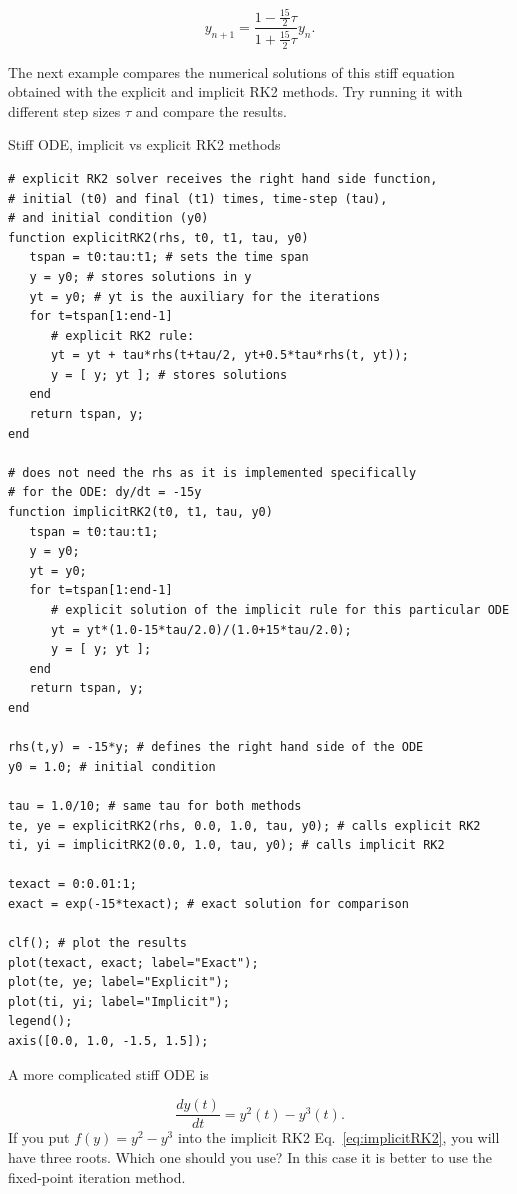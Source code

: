 \begin{equation}
 y_{n+1} = \dfrac{1 - \frac{15}{2}\tau}{1+\frac{15}{2}\tau} y_n.
\end{equation}

The next example compares the numerical solutions of this stiff equation obtained with the explicit and implicit RK2 methods. Try running it with different step sizes $\tau$ and compare the results.

\begin{example}{Stiff ODE, implicit vs explicit RK2 methods}
\label{ex:stiff1}
\begin{verbatim}
# explicit RK2 solver receives the right hand side function,
# initial (t0) and final (t1) times, time-step (tau),
# and initial condition (y0)
function explicitRK2(rhs, t0, t1, tau, y0)
   tspan = t0:tau:t1; # sets the time span
   y = y0; # stores solutions in y
   yt = y0; # yt is the auxiliary for the iterations
   for t=tspan[1:end-1]
      # explicit RK2 rule:
      yt = yt + tau*rhs(t+tau/2, yt+0.5*tau*rhs(t, yt));
      y = [ y; yt ]; # stores solutions
   end
   return tspan, y;
end

# does not need the rhs as it is implemented specifically
# for the ODE: dy/dt = -15y
function implicitRK2(t0, t1, tau, y0)
   tspan = t0:tau:t1;
   y = y0;
   yt = y0;
   for t=tspan[1:end-1]
      # explicit solution of the implicit rule for this particular ODE
      yt = yt*(1.0-15*tau/2.0)/(1.0+15*tau/2.0);
      y = [ y; yt ];
   end
   return tspan, y;
end

rhs(t,y) = -15*y; # defines the right hand side of the ODE
y0 = 1.0; # initial condition

tau = 1.0/10; # same tau for both methods
te, ye = explicitRK2(rhs, 0.0, 1.0, tau, y0); # calls explicit RK2
ti, yi = implicitRK2(0.0, 1.0, tau, y0); # calls implicit RK2

texact = 0:0.01:1;
exact = exp(-15*texact); # exact solution for comparison

clf(); # plot the results
plot(texact, exact; label="Exact");
plot(te, ye; label="Explicit");
plot(ti, yi; label="Implicit");
legend();
axis([0.0, 1.0, -1.5, 1.5]);
\end{verbatim}
\end{example}

A more complicated stiff ODE is

\begin{equation}
 \dfrac{d y(t)}{dt} = y^2(t) - y^3(t).
\end{equation}
If you put $f(y) = y^2-y^3$ into the implicit RK2 Eq.~\eqref{eq:implicitRK2}, you will have three roots. Which one should you use? In this case it is better to use the fixed-point iteration method.

